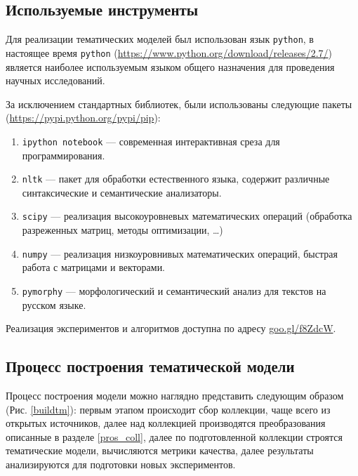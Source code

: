 \documentclass[a4paper, 14pt]{extarticle}
\begin{document}
\subsection{Используемые инструменты}
Для реализации тематических моделей был использован язык {\tt python}, в настоящее время {\tt python} (\href{https://www.python.org/download/releases/2.7/}{https://www.python.org/download/releases/2.7/}) является наиболее используемым языком общего назначения для проведения научных исследований. 

За исключением стандартных библиотек, были использованы следующие пакеты (\href{https://pypi.python.org/pypi/pip}{https://pypi.python.org/pypi/pip}): 

\begin{enumerate}
\item \texttt{ipython notebook} --- современная интерактивная среза для программирования. 
\item \texttt{nltk} --- пакет для обработки естественного языка, содержит различные синтаксические и семантические анализаторы.
\item \texttt{scipy} --- реализация высокоуровневых математических операций (обработка разреженных матриц, методы оптимизации, \dots) 
\item \texttt{numpy} --- реализация низкоуровнивых математических операций, быстрая работа с матрицами и векторами.
\item \texttt{pymorphy} --- морфологический и семантический анализ для текстов на русском языке.
\end{enumerate}
Реализация экспериментов и алгоритмов доступна по адресу  \href{https://goo.gl/f8ZdcW}{goo.gl/f8ZdcW}. 

\subsection{Процесс построения тематической модели}
Процесс построения модели можно наглядно представить следующим образом (Рис. \ref{buildtm}): первым этапом происходит сбор коллекции, чаще всего из открытых источников, далее над коллекцией производятся преобразования описанные в разделе \ref{pros_coll}, далее по подготовленной коллекции строятся тематические модели, вычисляются метрики качества, далее результаты анализируются для подготовки новых экспериментов.
\end{document}
